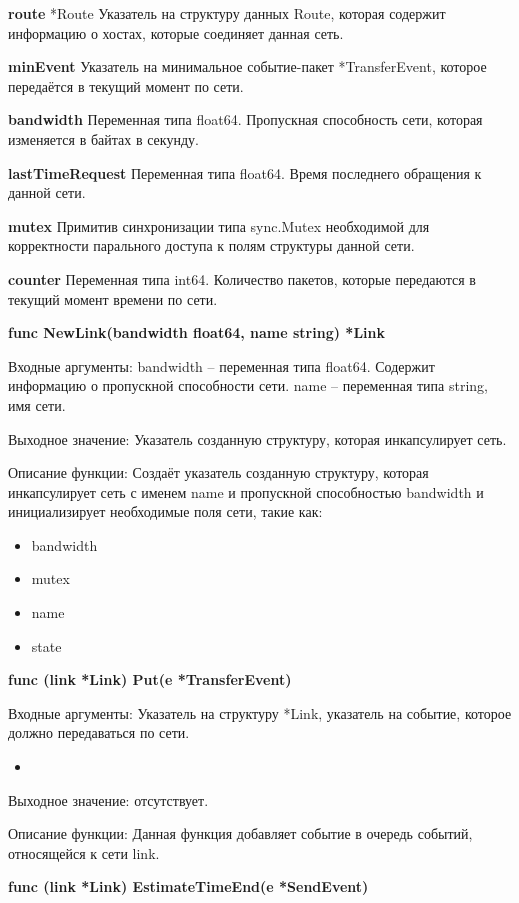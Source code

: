 \textbf{route}	 *Route
Указатель на структуру данных Route, которая содержит информацию о хостах, которые соединяет данная сеть. 

\textbf{minEvent}	
Указатель на минимальное событие-пакет *TransferEvent, которое передаётся в текущий момент по сети. 

\textbf{bandwidth}	 
Переменная типа float64. Пропускная способность сети, которая изменяется в байтах в секунду. 

\textbf{lastTimeRequest}
Переменная типа float64. Время последнего обращения к данной сети.

\textbf{mutex}	           
Примитив синхронизации типа sync.Mutex необходимой для корректности парального доступа к полям структуры данной сети.

\textbf{counter}
Переменная типа int64. Количество пакетов, которые передаются в текущий момент времени по сети. 


\textbf{func NewLink(bandwidth float64, name string) *Link}

Входные аргументы: bandwidth -- переменная типа float64. Содержит информацию о пропускной способности сети. name -- переменная типа string, имя сети. 

Выходное значение: Указатель созданную структуру, которая инкапсулирует сеть. 

Описание функции: Создаёт указатель созданную структуру, которая инкапсулирует сеть с именем name и пропускной способностью bandwidth и инициализирует необходимые поля сети, такие как:

\begin{itemize}
	\item bandwidth 
	\item mutex    
	\item name   
	\item state  
\end{itemize}




\textbf{func (link *Link) Put(e *TransferEvent)}

Входные аргументы: Указатель на структуру *Link, указатель на событие, которое должно передаваться по сети.
\begin{itemize}
	\item 
\end{itemize}
Выходное значение: отсутствует.

Описание функции: Данная функция добавляет событие в очередь событий, относящейся к сети link. 


\textbf{func (link *Link) EstimateTimeEnd(e *SendEvent)}

